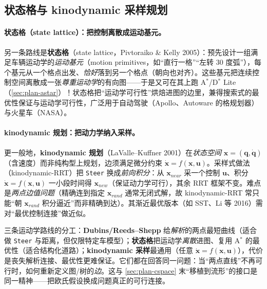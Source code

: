 \subsection{状态格与 kinodynamic 采样规划}
\label{sec:plan-lattice}

\paragraph{状态格（state lattice）：把控制离散成运动基元。}
另一条路线是\textbf{状态格}（state lattice，Pivtoraiko \& Kelly 2005\cite{pivtoraiko2009lattice}）：预先设计一组满足车辆运动学的\emph{运动基元}（motion primitives，如“直行一格”“左转 30 度弧”），每个基元从一个格点出发、\emph{恰好}落到另一个格点（朝向也对齐）。这些基元把连续控制空间离散成一张\emph{尊重运动学}的有向图——于是又可在其上跑 A$^*$/D$^*$ Lite（\cref{sec:plan-astar}）！状态格把“运动学可行性”烘焙进图的边里，兼得搜索式的最优性保证与运动学可行性，广泛用于自动驾驶（Apollo、Autoware 的格规划器）与火星车（NASA）。

\paragraph{kinodynamic 规划：把动力学纳入采样。}
更一般地，\textbf{kinodynamic 规划}（LaValle--Kuffner 2001\cite{lavalle2001kinodynamic}）在\emph{状态空间} $\mathbf{x}=(\mathbf{q},\dot{\mathbf{q}})$（含速度）而非纯构型上规划，边须满足微分约束 $\dot{\mathbf{x}}=f(\mathbf{x},\mathbf{u})$。采样式做法（kinodynamic-RRT）把 \texttt{Steer} 换成\emph{前向积分}：从 $\mathbf{x}_{near}$ 采一个控制 $\mathbf{u}$、积分 $\dot{\mathbf{x}}=f(\mathbf{x},\mathbf{u})$ 一小段时间得 $\mathbf{x}_{new}$（保证动力学可行），其余 RRT 框架不变。难点是\emph{两点边值问题}（精确连到指定 $\mathbf{x}_{rand}$ 通常无闭式解，故 kinodynamic-RRT 常只能“朝 $\mathbf{x}_{rand}$ 积分逼近”而非精确到达）。其渐近最优版本（如 SST、Li 等 2016）需对“最优控制连接”做近似。

\begin{insight}
三条运动学路线的分工：\textbf{Dubins/Reeds--Shepp} 给\emph{解析}的两点最短曲线（适合做 \texttt{Steer} 与距离，但仅限特定车模型）；\textbf{状态格}把运动学\emph{离散}进图、复用 A$^*$ 的最优性（适合结构化道路）；\textbf{kinodynamic 采样}最通用（任意 $\dot{\mathbf{x}}=f(\mathbf{x},\mathbf{u})$），代价是丧失解析连接、最优性更难保证。它们都在回答同一问题：当“两点直线”不再可行时，如何重新定义图/树的\emph{边}。这与 \cref{sec:plan-cspace} 末“移植到流形”的接口是同一精神——把欧氏假设换成问题真正的可行连接。
\end{insight}

